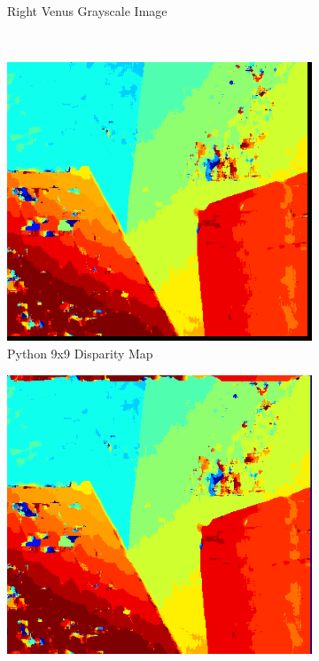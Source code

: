 \begin{figure}
\begin{center}
\begin{subfigure}{0.45\textwidth}
		\caption{Right Venus Grayscale Image}
		\label{fig:venusR}
	\end{subfigure}
	\\
	\begin{subfigure}{0.45\textwidth}
		\includegraphics[width=\textwidth]{figures/venus_9x9_python3.png}
		\caption{Python 9x9 Disparity Map}
		\label{fig:venusPy}
	\end{subfigure}
	\begin{subfigure}{0.45\textwidth}
		\includegraphics[width=\textwidth]{figures/venus_9x9_fpga.png}

\end{subfigure}
\end{center}
\end{figure}
